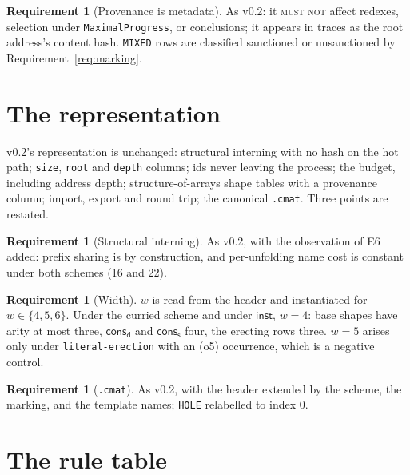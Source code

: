 \documentclass[11pt,a4paper]{article}
\newcommand{\code}[1]{\texttt{#1}}
\newcommand{\MUSTNOT}{\textsc{must not}}
\newcommand{\dd}{\mathsf{d}}
\newcommand{\sy}{\mathsf{s}}
\newcommand{\cons}{\mathsf{cons}}
\theoremstyle{definition}
\newtheorem{requirement}[definition]{Requirement}
\theoremstyle{plain}
\newcommand{\inst}{\mathsf{inst}}
\begin{document}
\begin{requirement}[Provenance is metadata]\label{req:provmeta}
As v0.2: it \MUSTNOT{} affect redexes, selection under
\code{MaximalProgress}, or conclusions; it appears in traces as the root
address's content hash. \code{MIXED} rows are classified sanctioned or
unsanctioned by Requirement~\ref{req:marking}.
\end{requirement}

\section{The representation}\label{sec:rep}

v0.2's representation is unchanged: structural interning with no hash on the
hot path; \code{size}, \code{root} and \code{depth} columns; ids never leaving
the process; the budget, including address depth; structure-of-arrays shape
tables with a provenance column; import, export and round trip; the
canonical \code{.cmat}. Three points are restated.

\begin{requirement}[Structural interning]\label{req:hashfree}
As v0.2, with the observation of E6 added: prefix sharing is by construction,
and per-unfolding name cost is constant under both schemes (16 and 22).
\end{requirement}

\begin{requirement}[Width]\label{req:soa}
$w$ is read from the header and instantiated for $w \in \{4,5,6\}$. Under the
curried scheme and under $\inst$, $w = 4$: base shapes have arity at most
three, $\cons_{\dd}$ and $\cons_{\sy}$ four, the erecting rows three. $w = 5$
arises only under \code{literal-erection} with an (o5) occurrence, which is a
negative control.
\end{requirement}

\begin{requirement}[\code{.cmat}]\label{req:cmat}
As v0.2, with the header extended by the scheme, the marking, and the
template names; \code{HOLE} relabelled to index $0$.
\end{requirement}

\section{The rule table}\label{sec:rules}
\end{document}
